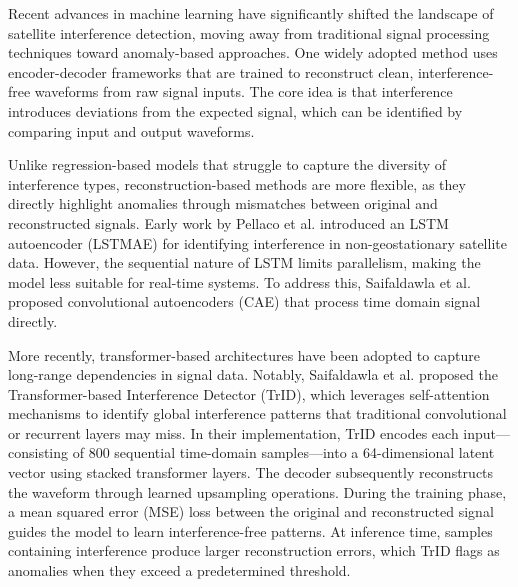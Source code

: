 \documentclass[conference]{IEEEtran}
\begin{document}

Recent advances in machine learning have significantly shifted the landscape of satellite interference detection, moving away from traditional signal processing techniques toward anomaly-based approaches. One widely adopted method uses encoder-decoder frameworks that are trained to reconstruct clean, interference-free waveforms from raw signal inputs. The core idea is that interference introduces deviations from the expected signal, which can be identified by comparing input and output waveforms.

Unlike regression-based models that struggle to capture the diversity of interference types, reconstruction-based methods are more flexible, as they directly highlight anomalies through mismatches between original and reconstructed signals. Early work by Pellaco et al. \cite{pellacoSpectrumPredictionInterference2019} introduced an LSTM autoencoder (LSTMAE) for identifying interference in non-geostationary satellite data. However, the sequential nature of LSTM limits parallelism, making the model less suitable for real-time systems. To address this, Saifaldawla et al. \cite{saifaldawlaConvolutionalAutoencodersNonGeostationary2024} proposed convolutional autoencoders (CAE) that process time domain signal directly.

More recently, transformer-based architectures have been adopted to capture long-range dependencies in signal data. Notably, Saifaldawla et al. \cite{saifaldawlaGenAIBasedModelsNGSO2024} proposed the Transformer-based Interference Detector (TrID), which leverages self-attention mechanisms to identify global interference patterns that traditional convolutional or recurrent layers may miss. In their implementation, TrID encodes each input—consisting of 800 sequential time-domain samples—into a 64-dimensional latent vector using stacked transformer layers. The decoder subsequently reconstructs the waveform through learned upsampling operations. During the training phase, a mean squared error (MSE) loss between the original and reconstructed signal guides the model to learn interference-free patterns. At inference time, samples containing interference produce larger reconstruction errors, which TrID flags as anomalies when they exceed a predetermined threshold.
\end{document}
